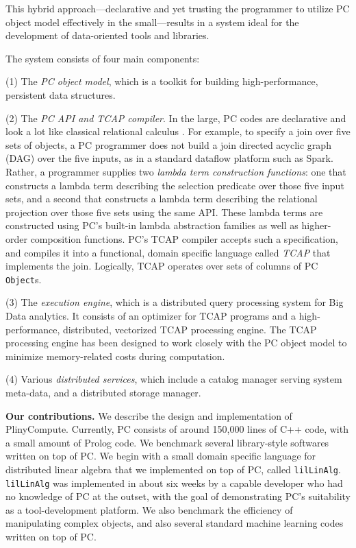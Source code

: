 This hybrid approach---declarative and yet trusting the programmer
to utilize PC object model effectively
in the small---results in a system ideal for the 
development of data-oriented tools and libraries.

The system consists of four main components: 

\vspace{3pt}
\noindent
(1) The \emph{PC object model}, which is a toolkit for building high-performance, persistent data structures.

\vspace {3pt}
\noindent
(2) The \emph{PC API and TCAP compiler}.  In the large, PC codes are
declarative and look a lot like classical relational calculus
\cite{codd1971data}.  For example, to specify a join over five sets of
objects, a PC programmer does not build a join directed acyclic graph (DAG) over the five inputs, as in a standard
dataflow platform such as Spark.  Rather, a programmer 
supplies two \emph{lambda term construction functions}: one that constructs a lambda term describing the selection
predicate over those five input sets, 
and a second that constructs a lambda term describing the relational projection over those five sets
using the same API.  These lambda terms are constructed using PC's built-in lambda abstraction families as well as higher-order composition functions.
 PC's TCAP compiler 
accepts such a specification, and compiles it into a functional, domain specific language called \emph{TCAP} that implements
the join.  Logically, TCAP operates over
sets of columns of PC \texttt{Object}s. 

\vspace{3pt}
\noindent
(3) The \emph{execution engine}, which is a distributed query processing
  system for Big Data analytics.
  It consists of an optimizer for TCAP
  programs and a 
high-performance, distributed, vectorized TCAP processing engine. 
The TCAP processing engine has been designed to work closely with the PC object model to
minimize memory-related costs during computation.

\vspace{3pt}
\noindent
(4) Various \emph{distributed services}, which include 
a catalog manager serving system meta-data, and a
distributed storage manager.



\vspace{8 pt}
\noindent
\textbf{Our contributions.}
We describe the design and implementation of PlinyCompute.  
Currently, PC consists of around
150,000 lines of C++ code, with a small amount of Prolog code.
We benchmark several library-style softwares written on top of PC.  We begin with a small domain specific language
for distributed linear algebra that we implemented on top of PC,
called \texttt{lilLinAlg}.  \texttt{lilLinAlg} was implemented in
about six weeks by a capable developer
who had no knowledge of PC at the outset, with the goal of demonstrating PC's suitability as a tool-development platform.  
We also benchmark the efficiency of manipulating complex objects, and also several standard machine learning codes written on top of PC.
